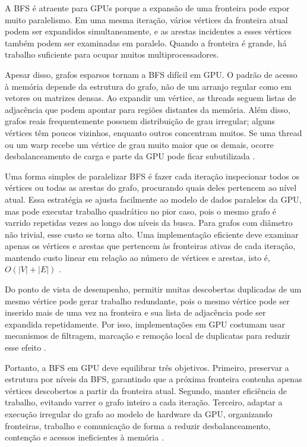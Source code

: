 A BFS é atraente para GPUs porque a expansão de uma fronteira pode expor muito
paralelismo. Em uma mesma iteração, vários vértices da fronteira atual podem ser
expandidos simultaneamente, e as arestas incidentes a esses vértices também podem
ser examinadas em paralelo. Quando a fronteira é grande, há trabalho suficiente
para ocupar muitos multiprocessadores. 

Apesar disso, grafos esparsos tornam a BFS difícil em GPU. O padrão de acesso à
memória depende da estrutura do grafo, não de um arranjo regular como em vetores
ou matrizes densas. Ao expandir um vértice, as threads seguem listas de
adjacência que podem apontar para regiões distantes da memória. Além disso, grafos
reais frequentemente possuem distribuição de grau irregular; alguns vértices têm
poucos vizinhos, enquanto outros concentram muitos. Se uma thread ou um warp recebe 
um vértice de grau muito maior que os demais, ocorre desbalanceamento de carga e 
parte da GPU pode ficar subutilizada \cite{merrillgpu}.

Uma forma simples de paralelizar BFS é fazer cada iteração inspecionar todos os 
vértices ou todas as arestas do grafo, procurando quais deles pertencem ao nível atual. 
Essa estratégia se ajusta facilmente ao modelo de dados paralelos da GPU, mas pode
executar trabalho quadrático no pior caso, pois o mesmo grafo é varrido repetidas
vezes ao longo dos níveis da busca. Para grafos com diâmetro não trivial, esse
custo se torna alto. Uma implementação eficiente deve examinar apenas os vértices
e arestas que pertencem às fronteiras ativas de cada iteração, mantendo custo
linear em relação ao número de vértices e arestas, isto é, $O(|V| + |E|)$
\cite{merrillgpu}.

Do ponto de vista de desempenho, permitir muitas descobertas duplicadas de um mesmo 
vértice pode gerar trabalho redundante, pois o mesmo vértice pode ser inserido mais 
de uma vez na fronteira e sua lista de adjacência pode ser expandida repetidamente. 
Por isso, implementações em GPU costumam usar mecanismos de filtragem, marcação e 
remoção local de duplicatas para reduzir esse efeito \cite{merrillgpu}.

Portanto, a BFS em GPU deve equilibrar três objetivos. Primeiro, preservar a
estrutura por níveis da BFS, garantindo que a próxima fronteira contenha apenas
vértices descobertos a partir da fronteira atual. Segundo, manter eficiência de
trabalho, evitando varrer o grafo inteiro a cada iteração. Terceiro, adaptar a
execução irregular do grafo ao modelo de hardware da GPU, organizando fronteiras,
trabalho e comunicação de forma a reduzir desbalanceamento, contenção e acessos
ineficientes à memória
\cite{merrillgpu}.

